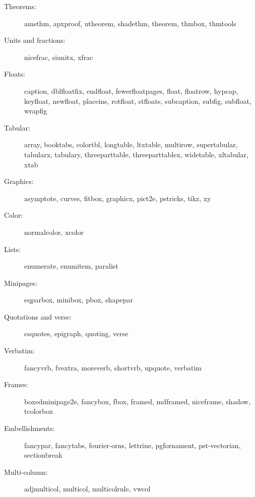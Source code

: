 \documentclass{article}
\def\pkg#1{#1}%
\renewcommand*{\pkg}[1]{#1}
\begin{document}
\begin{multicols}{2}
\begin{description}
\item[Theorems:]
    \pkg{amsthm}, \pkg{apxproof}, \pkg{ntheorem}, \pkg{shadethm},
    \pkg{theorem}, \pkg{thmbox}, \pkg{thmtools}

\item[Units and fractions:] \pkg{nicefrac}, \pkg{siunitx}, \pkg{xfrac}

\item[Floats:] \pkg{caption}, \pkg{dblfloatfix}, \pkg{endfloat}, \pkg{fewerfloatpages},
    \pkg{float}, \pkg{floatrow}, \pkg{hypcap}, \pkg{keyfloat}, \pkg{newfloat},
    \pkg{placeins}, \pkg{rotfloat}, \pkg{stfloats}, \pkg{subcaption}, \pkg{subfig},
    \pkg{subfloat}, \pkg{wrapfig}

\item[Tabular:] \pkg{array}, \pkg{booktabs}, \pkg{colortbl}, \pkg{longtable},
    \pkg{ltxtable}, \pkg{multirow},
    \pkg{supertabular}, \pkg{tabularx}, \pkg{tabulary},
    \pkg{threeparttable}, \pkg{threeparttablex},
    \pkg{widetable}, \pkg{xltabular}, \pkg{xtab}

\item[Graphics:] \pkg{asymptote}, \pkg{curves}, \pkg{fitbox}, \pkg{graphicx},
    \pkg{pict2e}, \pkg{pstricks}, \pkg{tikz}, \pkg{xy}

\item[Color:] \pkg{normalcolor}, \pkg{xcolor}

\item[Lists:] \pkg{enumerate}, \pkg{enumitem}, \pkg{paralist}

\item[Minipages:] \pkg{eqparbox}, \pkg{minibox}, \pkg{pbox}, \pkg{shapepar}

\item[Quotations and verse:] \pkg{csquotes}, \pkg{epigraph}, \pkg{quoting}, \pkg{verse}

\item[Verbatim:] \pkg{fancyvrb}, \pkg{fvextra}, \pkg{moreverb}, \pkg{shortvrb},
    \pkg{upquote}, \pkg{verbatim}

\item[Frames:] \pkg{boxedminipage2e}, \pkg{fancybox}, \pkg{fbox}, \pkg{framed},
    \pkg{mdframed}, \pkg{niceframe}, \pkg{shadow}, \pkg{tcolorbox}

\item[Embellishments:] \pkg{fancypar}, \pkg{fancytabs}, \pkg{fourier-orns},
    \pkg{lettrine}, \pkg{pgfornament}, \pkg{pst-vectorian}, \pkg{sectionbreak}

\item[Multi-column:] \pkg{adjmulticol}, \pkg{multicol}, \pkg{multicolrule}, \pkg{vwcol}


\end{description}
\end{multicols}
\end{document}
